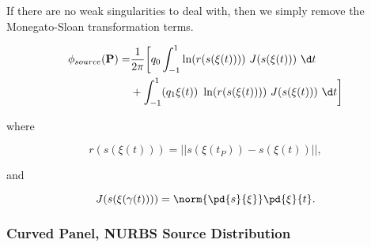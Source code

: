 \noindent If there are no weak singularities to deal with, then we simply remove the Monegato-Sloan transformation terms.

\[
\begin{split}
	\phi_{source}(\mathbf{P}) =& \frac{1}{2\pi} \biggr[
	q_0 \int_{-1}^1 \ln(r(s(\xi(t)))) ~J(s(\xi(t))) ~\d t \\
	&+ \int_{-1}^1 (q_1\xi(t)) ~\ln(r(s(\xi(t)))) ~J(s(\xi(t))) ~\d t \biggr]
\end{split}
\]

\noindent where

\[ r(s(\xi(t))) = || s(\xi(t_P)) - s(\xi(t)) ||, \]

\noindent and

\[J(s(\xi(\gamma(t)))) = \norm{\pd{ s}{ \xi}} \pd{ \xi}{ t} .\]



\subsubsection{Curved Panel, NURBS Source Distribution}


